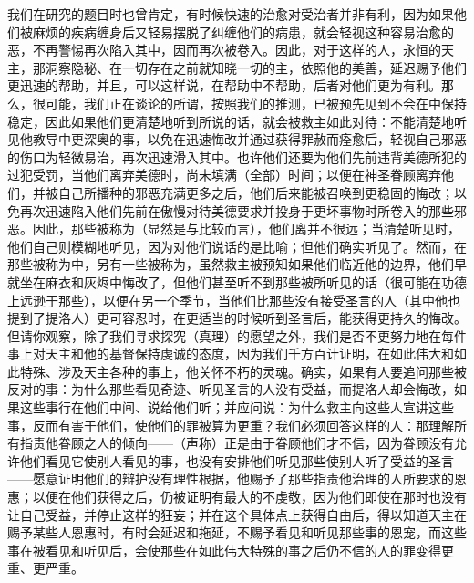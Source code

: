 我们在研究的题目时也曾肯定，有时候快速的治愈对受治者并非有利，因为如果他们被麻烦的疾病缠身后又轻易摆脱了纠缠他们的病患，就会轻视这种容易治愈的恶，不再警惕再次陷入其中，因而再次被卷入。因此，对于这样的人，永恒的天主，那洞察隐秘、在一切存在之前就知晓一切的主，依照他的美善，延迟赐予他们更迅速的帮助，并且，可以这样说，在帮助中不帮助，后者对他们更为有利。那么，很可能，我们正在谈论的所谓，按照我们的推测，已被预先见到不会在中保持稳定，因此如果他们更清楚地听到所说的话，就会被救主如此对待：不能清楚地听见他教导中更深奥的事，以免在迅速悔改并通过获得罪赦而痊愈后，轻视自己邪恶的伤口为轻微易治，再次迅速滑入其中。也许他们还要为他们先前违背美德所犯的过犯受罚，当他们离弃美德时，尚未填满（全部）时间；以便在神圣眷顾离弃他们，并被自己所播种的邪恶充满更多之后，他们后来能被召唤到更稳固的悔改；以免再次迅速陷入他们先前在傲慢对待美德要求并投身于更坏事物时所卷入的那些邪恶。因此，那些被称为（显然是与比较而言），他们离并不很远；当清楚听见时，他们自己则模糊地听见，因为对他们说话的是比喻；但他们确实听见了。然而，在那些被称为中，另有一些被称为，虽然救主被预知如果他们临近他的边界，他们早就坐在麻衣和灰烬中悔改了，但他们甚至听不到那些被所听见的话（很可能在功德上远逊于那些），以便在另一个季节，当他们比那些没有接受圣言的人（其中他也提到了提洛人）更可容忍时，在更适当的时候听到圣言后，能获得更持久的悔改。但请你观察，除了我们寻求探究（真理）的愿望之外，我们是否不更努力地在每件事上对天主和他的基督保持虔诚的态度，因为我们千方百计证明，在如此伟大和如此特殊、涉及天主各种的事上，他关怀不朽的灵魂。确实，如果有人要追问那些被反对的事：为什么那些看见奇迹、听见圣言的人没有受益，而提洛人却会悔改，如果这些事行在他们中间、说给他们听；并应问说：为什么救主向这些人宣讲这些事，反而有害于他们，使他们的罪被算为更重？我们必须回答这样的人：那理解所有指责他眷顾之人的倾向——（声称）正是由于眷顾他们才不信，因为眷顾没有允许他们看见它使别人看见的事，也没有安排他们听见那些使别人听了受益的圣言——愿意证明他们的辩护没有理性根据，他赐予了那些指责他治理的人所要求的恩惠；以便在他们获得之后，仍被证明有最大的不虔敬，因为他们即使在那时也没有让自己受益，并停止这样的狂妄；并在这个具体点上获得自由后，得以知道天主在赐予某些人恩惠时，有时会延迟和拖延，不赐予看见和听见那些事的恩宠，而这些事在被看见和听见后，会使那些在如此伟大特殊的事之后仍不信的人的罪变得更重、更严重。\par

